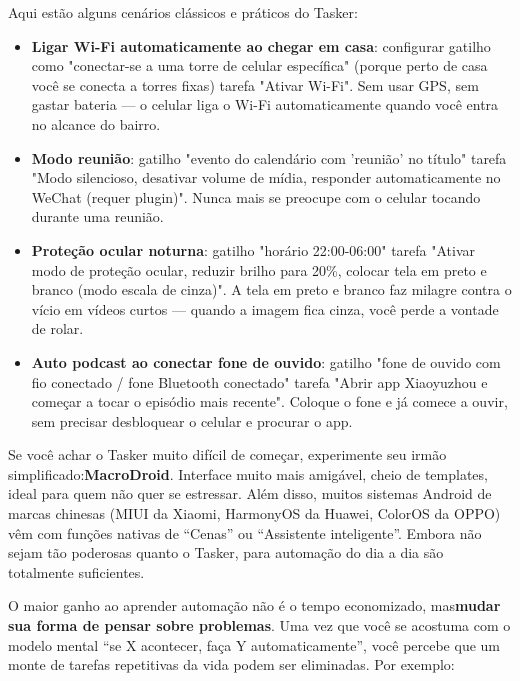 Aqui estão alguns cenários clássicos e práticos do Tasker:

\begin{itemize}
  \item \textbf{Ligar Wi-Fi automaticamente ao chegar em casa}: configurar gatilho como "conectar-se a uma torre de celular específica" (porque perto de casa você se conecta a torres fixas) tarefa "Ativar Wi-Fi". Sem usar GPS, sem gastar bateria — o celular liga o Wi-Fi automaticamente quando você entra no alcance do bairro.
  \item \textbf{Modo reunião}: gatilho "evento do calendário com 'reunião' no título" tarefa "Modo silencioso, desativar volume de mídia, responder automaticamente no WeChat (requer plugin)". Nunca mais se preocupe com o celular tocando durante uma reunião.
  \item \textbf{Proteção ocular noturna}: gatilho "horário 22:00-06:00" tarefa "Ativar modo de proteção ocular, reduzir brilho para 20\%, colocar tela em preto e branco (modo escala de cinza)". A tela em preto e branco faz milagre contra o vício em vídeos curtos — quando a imagem fica cinza, você perde a vontade de rolar.
  \item \textbf{Auto podcast ao conectar fone de ouvido}: gatilho "fone de ouvido com fio conectado / fone Bluetooth conectado" tarefa "Abrir app Xiaoyuzhou e começar a tocar o episódio mais recente". Coloque o fone e já comece a ouvir, sem precisar desbloquear o celular e procurar o app.
\end{itemize}

Se você achar o Tasker muito difícil de começar, experimente seu irmão simplificado:\textbf{MacroDroid}. Interface muito mais amigável, cheio de templates, ideal para quem não quer se estressar. Além disso, muitos sistemas Android de marcas chinesas (MIUI da Xiaomi, HarmonyOS da Huawei, ColorOS da OPPO) vêm com funções nativas de “Cenas” ou “Assistente inteligente”. Embora não sejam tão poderosas quanto o Tasker, para automação do dia a dia são totalmente suficientes.


O maior ganho ao aprender automação não é o tempo economizado, mas\textbf{mudar sua forma de pensar sobre problemas}. Uma vez que você se acostuma com o modelo mental “se X acontecer, faça Y automaticamente”, você percebe que um monte de tarefas repetitivas da vida podem ser eliminadas. Por exemplo:

